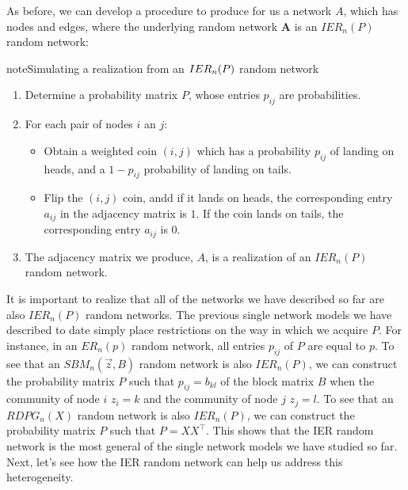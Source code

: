 \documentclass[letterpaper,10pt,english]{jupyterBook}
\begin{document}
\sphinxAtStartPar
As before, we can develop a procedure to produce for us a network \(A\), which has nodes and edges, where the underlying random network \(\mathbf A\) is an \(IER_n(P)\) random network:

\begin{sphinxadmonition}{note}{Simulating a realization from an \protect\(IER_n(P)\protect\) random network}
\begin{enumerate}
%
\item {} 
\sphinxAtStartPar
Determine a probability matrix \(P\), whose entries \(p_{ij}\) are probabilities.

\item {} 
\sphinxAtStartPar
For each pair of nodes \(i\) an \(j\):
\begin{itemize}
\item {} 
\sphinxAtStartPar
Obtain a weighted coin \((i,j)\) which has a probability \(p_{ij}\) of landing on heads, and a \(1 - p_{ij}\) probability of landing on tails.

\item {} 
\sphinxAtStartPar
Flip the \((i,j)\) coin, andd if it lands on heads, the corresponding entry \(a_{ij}\) in the adjacency matrix is \(1\). If the coin lands on tails, the corresponding entry \(a_{ij}\) is \(0\).

\end{itemize}

\item {} 
\sphinxAtStartPar
The adjacency matrix we produce, \(A\), is a realization of an \(IER_n(P)\) random network.

\end{enumerate}
\end{sphinxadmonition}

\sphinxAtStartPar
It is important to realize that all of the networks we have described so far are also \(IER_n(P)\) random networks. The previous single network models we have described to date simply place restrictions on the way in which we acquire \(P\). For instance, in an \(ER_n(p)\) random network, all entries \(p_{ij}\) of \(P\) are equal to \(p\). To see that an \(SBM_n(\vec z, B)\) random network is also \(IER_n(P)\), we can construct the probability matrix \(P\) such that \(p_{ij} = b_{kl}\) of the block matrix \(B\) when the community of node \(i\) \(z_i = k\) and the community of node \(j\) \(z_j = l\). To see that an \(RDPG_n(X)\) random network is also \(IER_n(P)\), we can construct the probability matrix \(P\) such that \(P = XX^\top\). This shows that the IER random network is the most general of the single network models we have studied so far. Next, let’s see how the IER random network can help us address this heterogeneity.
\end{document}
